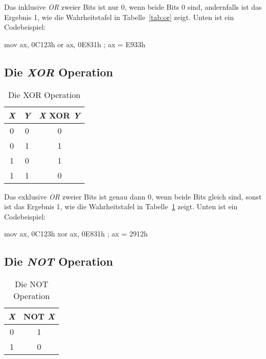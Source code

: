 Das inklusive \emph{OR} zweier Bits ist nur 0, wenn beide Bits 0
sind, andernfalls ist das Ergebnis 1, wie die Wahrheitstafel in
Tabelle~\ref{tab:or} zeigt. Unten ist ein Codebeispiel:

\begin{AsmCodeListing}[frame=none, numbers=left, firstnumber=last]
      mov    ax, 0C123h
      or     ax, 0E831h       ; ax = E933h
\end{AsmCodeListing}

\subsection{Die \emph{XOR} Operation }

\begin{table}[ht]
\centering
\begin{tabular}{|c|c|c|}
 \hline
 \emph{X} & \emph{Y} & \emph{X} XOR \emph{Y} \\
 \hline \hline
 0 & 0 & 0 \\
 0 & 1 & 1 \\
 1 & 0 & 1 \\
 1 & 1 & 0 \\
 \hline
\end{tabular}
\caption{Die XOR Operation \label{tab:xor}}
\end{table}

Das exklusive \emph{OR} zweier Bits ist genau dann 0, wenn beide
Bits gleich sind, sonst ist das Ergebnis 1, wie die Wahrheitstafel
in Tabelle~\ref{tab:xor} zeigt. Unten ist ein Codebeispiel:

\begin{AsmCodeListing}[frame=none, numbers=left, firstnumber=last]
      mov    ax, 0C123h
      xor    ax, 0E831h       ; ax = 2912h
\end{AsmCodeListing}

\subsection{Die \emph{NOT} Operation }

\begin{table}[ht]
\centering
\begin{tabular}{|c|c|}
 \hline
 \emph{X} & NOT \emph{X} \\
 \hline \hline
 0 & 1 \\
 1 & 0 \\
 \hline
\end{tabular}
\caption{Die NOT Operation \label{tab:not}}
\end{table}

